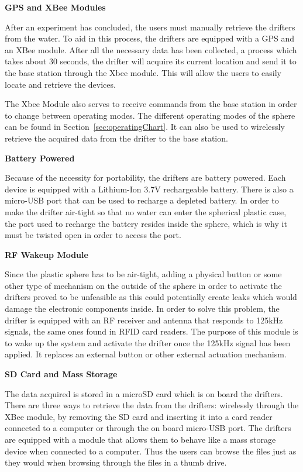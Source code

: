 \noindent\textbf{GPS and XBee Modules}

After an experiment has concluded, the users must manually retrieve the drifters from the water.  To aid in this process, the drifters are equipped with a GPS and an XBee module.  After all the necessary data has been collected, a process which takes about 30 seconds, the drifter will acquire its current location and send it to the base station through the Xbee module.  This will allow the users to easily locate and retrieve the devices.

The Xbee Module also serves to receive commands from the base station in order to change between operating modes. The different operating modes of the sphere can be found in Section~\ref{sec:operatingChart}.  It can also be used to wirelessly retrieve the acquired data from the drifter to the base station.

\noindent\textbf{Battery Powered}

Because of the necessity for portability, the drifters are battery powered.  Each device is equipped with a Lithium-Ion 3.7V rechargeable battery.  There is also a micro-USB port that can be used to recharge a depleted battery.  In order to make the drifter air-tight so that no water can enter the spherical plastic case, the port used to recharge the battery resides inside the sphere, which is why it must be twisted open in order to access the port.

\noindent\textbf{RF Wakeup Module}

Since the plastic sphere has to be air-tight, adding a physical button or some other type of mechanism on the outside of the sphere in order to activate the drifters proved to be unfeasible as this could potentially create leaks which would damage the electronic components inside. In order to solve this problem, the drifter is equipped with an RF receiver and antenna that responds to 125kHz signals, the same ones found in RFID card readers.  The purpose of this module is to wake up the system and activate the drifter once the 125kHz signal has been applied.  It replaces an external button or other external actuation mechanism.

\noindent\textbf{SD Card and Mass Storage}

The data acquired is stored in a microSD card which is on board the drifters.  There are three ways to retrieve the data from the drifters: wirelessly through the XBee module, by removing the SD card and inserting it into a card reader connected to a computer or through the on board micro-USB port.  The drifters are equipped with a module that allows them to behave like a mass storage device when connected to a computer.  Thus the users can browse the files just as they would when browsing through the files in a thumb drive.

